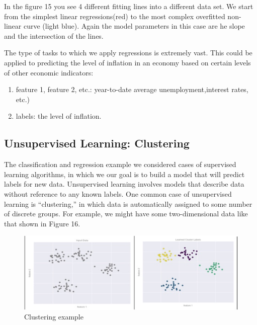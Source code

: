 \documentclass{tufte-handout}
\begin{document}
In the figure 15 you see 4 different fitting lines into a different data set. We start from the simplest linear regressions(red) to the most complex overfitted non-linear curve (light blue). Again the model parameters in this case are he slope and the intersection of the lines. 

The type of tasks to which we apply regressions is extremely vast. This could be applied to predicting the level of inflation in an economy based on certain levels of other economic indicators:
\begin{enumerate}
    \item feature 1, feature 2, etc.: year-to-date average unemployment,interest rates, etc.)
    \item labels:  the level of inflation.
\end{enumerate}



\subsection{Unsupervised Learning: Clustering}

The classification and regression example we considered cases of supervised learning algorithms, in which we our goal is to build a model that will predict labels for new data. Unsupervised learning involves models that describe data without reference to any known labels.
One common case of unsupervised learning is “clustering,” in which data is automatically assigned to some number of discrete groups. For example, we might have some two-dimensional data like that shown in Figure 16.

\begin{figure}[h]%
  \includegraphics[width=\linewidth]{clustering.jpg}
  \caption{Clustering example}
  \label{fig:clustering}
\end{figure}
\end{document}
